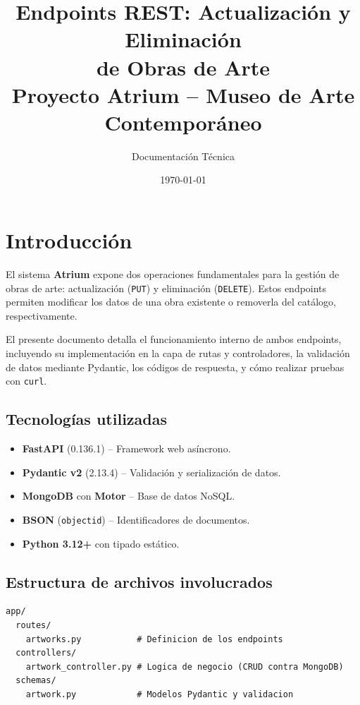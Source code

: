 \documentclass[12pt,a4paper]{article}
\title{\textbf{Endpoints REST: Actualización y Eliminación}\\de Obras de Arte\\\large Proyecto Atrium -- Museo de Arte Contemporáneo}
\author{Documentación Técnica}
\date{\today}
\begin{document}
\maketitle
\thispagestyle{empty}
\newpage

\tableofcontents
\newpage

\section{Introducción}

El sistema \textbf{Atrium} expone dos operaciones fundamentales para la
gestión de obras de arte: actualización (\texttt{PUT}) y eliminación
(\texttt{DELETE}). Estos endpoints permiten modificar los datos de una obra
existente o removerla del catálogo, respectivamente.

El presente documento detalla el funcionamiento interno de ambos endpoints,
incluyendo su implementación en la capa de rutas y controladores, la
validación de datos mediante Pydantic, los códigos de respuesta, y cómo
realizar pruebas con \texttt{curl}.

\subsection{Tecnologías utilizadas}

\begin{itemize}
    \item \textbf{FastAPI} (0.136.1) -- Framework web asíncrono.
    \item \textbf{Pydantic v2} (2.13.4) -- Validación y serialización de datos.
    \item \textbf{MongoDB} con \textbf{Motor} -- Base de datos NoSQL.
    \item \textbf{BSON} (\texttt{objectid}) -- Identificadores de documentos.
    \item \textbf{Python 3.12+} con tipado estático.
\end{itemize}

\subsection{Estructura de archivos involucrados}

\begin{verbatim}
app/
  routes/
    artworks.py           # Definicion de los endpoints
  controllers/
    artwork_controller.py # Logica de negocio (CRUD contra MongoDB)
  schemas/
    artwork.py            # Modelos Pydantic y validacion
\end{verbatim}
\end{document}
